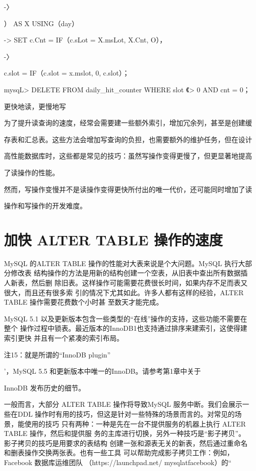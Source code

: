 -〉

） AS X USING（day）

-> SET c.Cnt = IF（c.sLot = X.msLot, X.Cnt, O），

-〉

c.slot = IF（c.slot = x.mslot, 0, c.slot）；

mysqL> DELETE FROM daily\_hit\_counter WHERE slot 《> 0 AND cnt = 0；

更快地读，更慢地写

为了提升读查询的速度，经常会需要建一些额外索引，增加冗余列，甚至是创建缓

存表和汇总表。这些方法会增加写查询的负担，也需要额外的维护任务，但在设计

高性能数据库时，这些都是常见的技巧：虽然写操作变得更慢了，但更显著地提高

了读操作的性能。

然而，写操作变慢并不是读操作变得更快所付出的唯一代价，还可能同时增加了读

操作和写操作的开发难度。

\section{加快 ALTER TABLE 操作的速度}
MySQL 的ALTER TABLE 操作的性能对大表来说是个大问题。MySQL 执行大部分修改表
结构操作的方法是用新的结构创建一个空表，从旧表中查出所有数据插人新表，然后删
除旧表。这样操作可能需要花费很长时间，如果内存不足而表又很大，而且还有很多索
引的情况下尤其如此。许多人都有这样的经验，ALTER TABLE 操作需要花费数个小时甚
至数天才能完成。

MySQL 5.1 以及更新版本包含一些类型的“在线”操作的支持，这些功能不需要在整个
操作过程中锁表。最近版本的InnoDB1也支持通过排序来建索引，这使得建索引更快
并且有一个紧凑的索引布局。

注15：就是所谓的“InnoDB plugin”

'，MySQL 5.5 和更新版本中唯一的InnoDB。请参考第1章中关于

InnoDB 发布历史的细节。

一般而言，大部分 ALTER TABLE 操作将导致MySQL 服务中断。我们会展示一些在DDL
操作时有用的技巧，但这是针对一些特殊的场景而言的。对常见的场景，能使用的技巧
只有两种：一种是先在一台不提供服务的机器上执行 ALTER TABLE 操作，然后和提供服
务的主库进行切换，另外一种技巧是“影子拷贝”。影子拷贝的技巧是用要求的表结构
创建一张和源表无关的新表，然后通过重命名和删表操作交换两张表。也有一些工具
可以帮助完成影子拷贝工作：例如，Facebook 数据库运维团队 （https://launchpad.net/
mysqlatfacebook）的“

